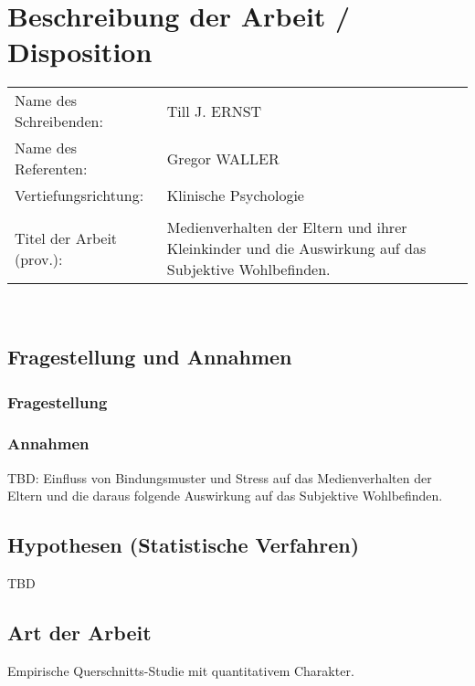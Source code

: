 \section{Beschreibung der Arbeit / Disposition}
\hspace{-0.9cm} %
\begin{tabular}{p{} p{10cm}} 
Name des Schreibenden: & Till J. ERNST \\ 
Name des Referenten: & Gregor WALLER \\
Vertiefungsrichtung: & Klinische Psychologie \\
& \\
Titel der Arbeit (prov.): & Medienverhalten der Eltern und ihrer Kleinkinder und die Auswirkung auf das Subjektive Wohlbefinden.\\
\end{tabular} \\
\subsection{Fragestellung und Annahmen}
\subsubsection{Fragestellung}
\subsubsection{Annahmen}
TBD: Einfluss von Bindungsmuster und Stress auf das Medienverhalten der Eltern und die daraus folgende Auswirkung auf das Subjektive Wohlbefinden.

\subsection{Hypothesen (Statistische Verfahren)}
TBD
\subsection{Art der Arbeit}
Empirische Querschnitts-Studie mit quantitativem Charakter.
